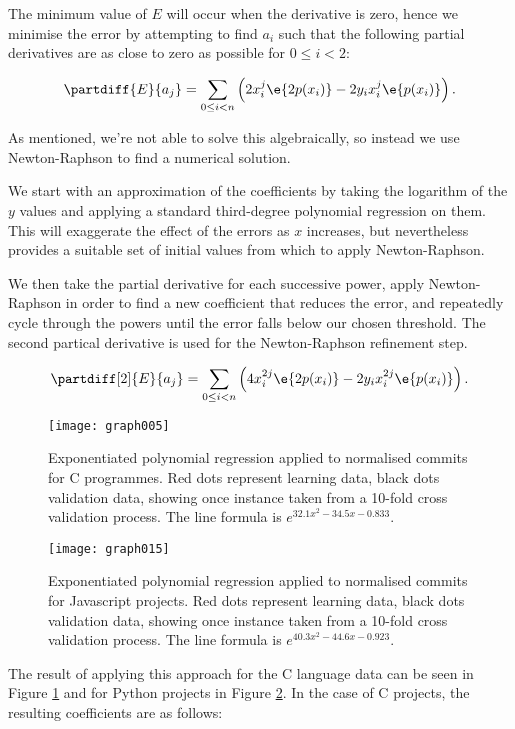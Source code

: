 \documentclass[10pt,journal,compsoc]{IEEEtran}
\begin{document}
The minimum value of $E$ will occur when the derivative is zero, hence we minimise the error by attempting to find $a_i$ such that the following partial derivatives are as close to zero as possible for $0 \le i < 2$:

$$
\partdiff{E}{a_j} = \sum_{0 \le i < n} \left( 2 x_i^j \e{2 p(x_i)} - 2 y_i x_i^j \e{p(x_i)} \right) .
$$

As mentioned, we're not able to solve this algebraically, so instead we use Newton-Raphson to find a numerical solution.


We start with an approximation of the coefficients by taking the logarithm of the $y$ values and applying a standard third-degree polynomial regression on them. This will exaggerate the effect of the errors as $x$ increases, but nevertheless provides a suitable set of initial values from which to apply Newton-Raphson.

We then take the partial derivative for each successive power, apply Newton-Raphson in order to find a new coefficient that reduces the error, and repeatedly cycle through the powers until the error falls below our chosen threshold. The second partical derivative is used for the Newton-Raphson refinement step.

$$
\partdiff[2]{E}{a_j} = \sum_{0 \le i < n} \left( 4 x_i^{2j} \e{2 p(x_i)} - 2 y_i x_i^{2j} \e{p(x_i)} \right) .
$$

\begin{figure}[t]
\centering
\texttt{[image: graph005]}%
\caption{\label{fig:c-exp}Exponentiated polynomial regression applied to normalised commits for C programmes. Red dots represent learning data, black dots validation data, showing once instance taken from a 10-fold cross validation process. The line formula is $e^{32.1x^{2} - 34.5x - 0.833}$.}
\end{figure}

\begin{figure}[t]
\centering
\texttt{[image: graph015]}%
\caption{\label{fig:javascript-exp}Exponentiated polynomial regression applied to normalised commits for Javascript projects. Red dots represent learning data, black dots validation data, showing once instance taken from a 10-fold cross validation process. The line formula is $e^{40.3x^{2} - 44.6x - 0.923}$.}
\end{figure}

The result of applying this approach for the C language data can be seen in Figure \ref{fig:c-exp} and for Python projects in Figure \ref{fig:javascript-exp}. In the case of C projects, the resulting coefficients are as follows:
\end{document}
